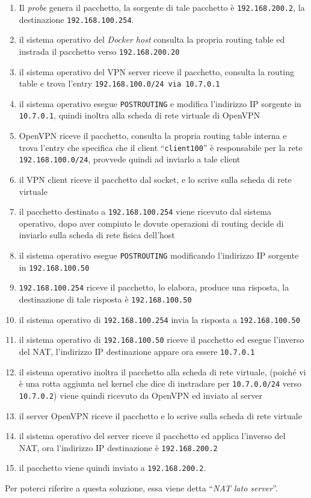 \begin{enumerate}
  \item Il \textit{probe} genera il pacchetto, la sorgente di tale pacchetto è
  \texttt{192.168.200.2}, la destinazione \texttt{192.168.100.254}.
  \item il sistema operativo del \textit{Docker host} consulta la propria routing table
  ed instrada il pacchetto verso \texttt{192.168.200.20}
  \item il sistema operativo del VPN server riceve il pacchetto, consulta la
  routing table e trova l'entry \texttt{192.168.100.0/24 via 10.7.0.1}
  \item il sistema operativo esegue \texttt{POSTROUTING} e modifica l'indirizzo IP
  sorgente in \texttt{10.7.0.1}, quindi inoltra
  alla scheda di rete virtuale di OpenVPN
  \item OpenVPN riceve il pacchetto, consulta la propria routing table interna e
  trova l'entry che specifica che il client ``\texttt{client100}'' è responsabile per
  la rete \texttt{192.168.100.0/24}, provvede quindi ad inviarlo a tale client
  \item il VPN client riceve il pacchetto dal socket, e lo scrive sulla scheda di rete
  virtuale
  \item il pacchetto destinato a \texttt{192.168.100.254} viene ricevuto dal sistema
  operativo, dopo aver compiuto le dovute operazioni di routing decide di inviarlo
  sulla scheda di rete fisica dell'host
  \item il sistema operativo esegue \texttt{POSTROUTING} modificando l'indirizzo IP
  sorgente in \texttt{192.168.100.50}
  \item \texttt{192.168.100.254} riceve il pacchetto, lo elabora, produce una risposta,
  la destinazione di tale risposta è \texttt{192.168.100.50}
  \item il sistema operativo di \texttt{192.168.100.254} invia la risposta a
  \texttt{192.168.100.50}
  \item il sistema operativo di \texttt{192.168.100.50} riceve il pacchetto ed
  esegue l'inverso del NAT, l'indirizzo IP destinazione appare ora essere \texttt{10.7.0.1}
  \item il sistema operativo inoltra il pacchetto alla scheda di rete virtuale, (poiché
  vi è una rotta aggiunta nel kernel che dice di instradare per \texttt{10.7.0.0/24}
  verso \texttt{10.7.0.2})
  viene quindi ricevuto da OpenVPN ed inviato al server
  \item il server OpenVPN riceve il pacchetto e lo scrive sulla scheda di rete virtuale
  \item il sistema operativo del server riceve il pacchetto ed applica l'inverso del NAT,
  ora l'indirizzo IP destinazione è \texttt{192.168.200.2}
  \item il pacchetto viene quindi inviato  a \texttt{192.168.200.2}.
\end{enumerate}
Per poterci riferire a questa soluzione, essa viene detta ``\textit{NAT lato server}''.
